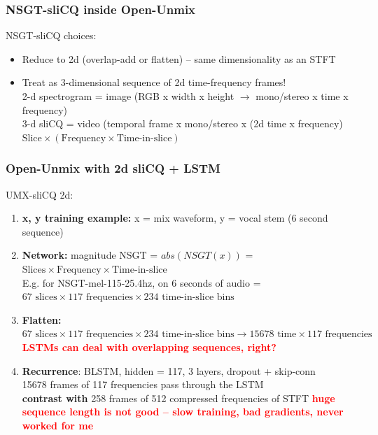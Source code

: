 \documentclass[usenames,dvipsnames]{beamer}
\begin{document}
\begin{frame}
	\frametitle{NSGT-sliCQ inside Open-Unmix}
	NSGT-sliCQ choices:
	\begin{itemize}
		\item
			Reduce to 2d (overlap-add or flatten) -- same dimensionality as an STFT
		\item
			Treat as 3-dimensional sequence of 2d time-frequency frames!\\
			2-d spectrogram = image (RGB x width x height $\rightarrow$ mono/stereo x time x frequency)\\
			3-d sliCQ = video (temporal frame x mono/stereo x (2d time x frequency)\\
			$\text{Slice} \times (\text{Frequency} \times \text{Time-in-slice})$
	\end{itemize}
\end{frame}

\begin{frame}
	\frametitle{Open-Unmix with 2d sliCQ + LSTM}
	UMX-sliCQ 2d:
	\begin{enumerate}
		\item
			\textbf{x, y training example:} x = mix waveform, y = vocal stem (6 second sequence)
		\item
			\textbf{Network:} magnitude NSGT = $abs(NSGT(x))$ = $\text{Slices} \times \text{Frequency} \times \text{Time-in-slice}$\\E.g. for NSGT-mel-115-25.4hz, on 6 seconds of audio = $67 \text{ slices} \times 117 \text{ frequencies} \times 234 \text{ time-in-slice bins} $
		\item
			\textbf{Flatten:} $67 \text{ slices} \times 117 \text{ frequencies} \times 234 \text{ time-in-slice bins} \rightarrow 15678 \text{ time} \times 117 \text { frequencies}$\\
			\textbf{\textcolor{red}{LSTMs can deal with overlapping sequences, right?}}
		\item
			\textbf{Recurrence}: BLSTM, hidden = 117, 3 layers, dropout + skip-conn\\
			15678 frames of 117 frequencies pass through the LSTM\\
			\textbf{contrast with} 258 frames of 512 compressed frequencies of STFT
			\textbf{\textcolor{red}{huge sequence length is not good -- slow training, bad gradients, never worked for me}}
	\end{enumerate}
\end{frame}
\end{document}
